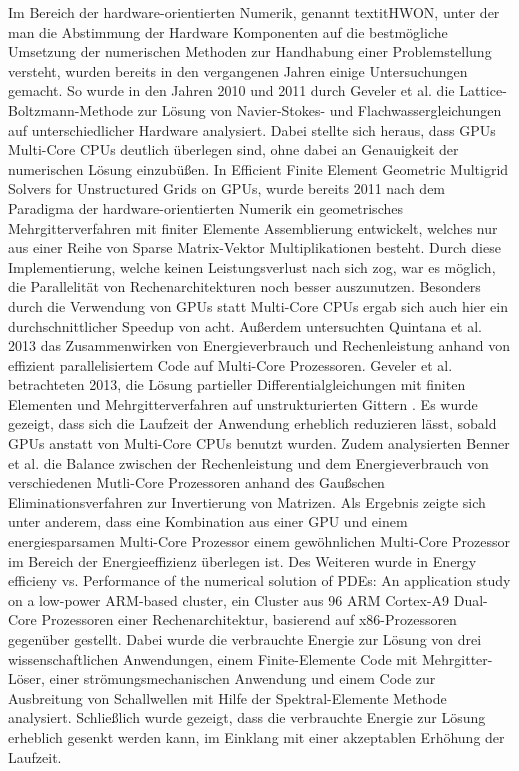 Im Bereich der hardware-orientierten Numerik, genannt textit{HWON}, unter der man die Abstimmung der Hardware Komponenten auf die bestmögliche Umsetzung der numerischen Methoden zur Handhabung einer Problemstellung versteht, wurden bereits in den vergangenen Jahren einige Untersuchungen gemacht. 
So wurde in den Jahren 2010 und 2011 durch Geveler et al. \cite{GevelerRibbrockMallachGoeddeke2011} die Lattice-Boltzmann-Methode zur Lösung von Navier-Stokes- und Flachwassergleichungen auf unterschiedlicher Hardware analysiert. Dabei stellte sich heraus, dass GPUs Multi-Core CPUs deutlich überlegen sind, ohne dabei an Genauigkeit der numerischen Lösung einzubü\ss en. 
In \glqq Efficient Finite Element Geometric Multigrid Solvers for Unstructured Grids on GPUs\grqq\cite{GevelerRibbrockGoeddekeZajacTurek2011}, wurde bereits 2011 nach dem Paradigma der hardware-orientierten Numerik ein geometrisches Mehrgitterverfahren mit finiter Elemente Assemblierung entwickelt, welches nur aus einer Reihe von Sparse Matrix-Vektor Multiplikationen besteht. Durch diese Implementierung, welche keinen Leistungsverlust nach sich zog, war es möglich, die Parallelität von Rechenarchitekturen noch besser auszunutzen. Besonders durch die Verwendung von GPUs statt Multi-Core CPUs ergab sich auch hier ein durchschnittlicher Speedup von acht.
Außerdem untersuchten Quintana et al. \cite{Quintana} 2013 das Zusammenwirken von Energieverbrauch und Rechenleistung anhand von effizient parallelisiertem Code auf Multi-Core Prozessoren. 
Geveler et al. betrachteten 2013, die Lösung partieller Differentialgleichungen mit finiten Elementen und Mehrgitterverfahren auf unstrukturierten Gittern \cite{GevelerRibbrockGoeddekeZajacTurek2011c}. Es wurde gezeigt, dass sich die Laufzeit der Anwendung erheblich reduzieren lässt, sobald GPUs anstatt von Multi-Core CPUs benutzt wurden. 
Zudem analysierten Benner et al. \cite{Benner} die Balance zwischen der Rechenleistung und dem Energieverbrauch von verschiedenen Mutli-Core Prozessoren anhand des Gau\ss schen Eliminationsverfahren zur Invertierung von Matrizen. Als Ergebnis zeigte sich unter anderem, dass eine Kombination aus einer GPU und einem energiesparsamen Multi-Core Prozessor einem gewöhnlichen Multi-Core Prozessor im Bereich der Energieeffizienz überlegen ist. 
Des Weiteren wurde in \glqq Energy efficieny vs. Performance of the numerical solution of PDEs: An application study on a low-power ARM-based cluster\grqq\cite{GoeddekeKomatitschGevelerRibbrockRajovicPuzovicRamirez2013}, ein Cluster aus 96 ARM Cortex-A9 Dual-Core Prozessoren einer Rechenarchitektur, basierend auf x86-Prozessoren gegenüber gestellt. Dabei wurde die verbrauchte Energie zur Lösung von drei wissenschaftlichen Anwendungen, einem Finite-Elemente Code mit Mehrgitter-Löser, einer strömungsmechanischen Anwendung und einem Code zur Ausbreitung von Schallwellen mit Hilfe der Spektral-Elemente Methode analysiert. Schließlich wurde gezeigt, dass die verbrauchte Energie zur Lösung erheblich gesenkt werden kann, im Einklang mit einer akzeptablen Erhöhung der Laufzeit. 
